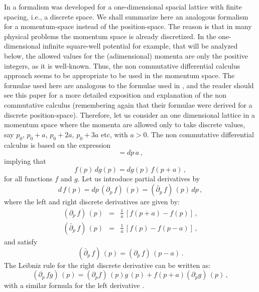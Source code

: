 \documentclass[a4paper,12pt]{article}
\begin{document}
In  \cite{dimakis1} 
a formalism was developed for a one-dimensional 
spacial lattice with finite 
spacing, i.e., a discrete space. We shall summarize here an 
analogous  
formalism for a momentum-space instead of the 
position-space. The 
reason is that in many physical problems the momentum space is 
already discretized. In the 
one-dimensional infinite square-well potential for example, 
that will be analyzed below, 
the allowed values for the (adimensional) momenta are 
only the positive integers, as it is well-known. 
Thus, the non commutative differential calculus 
approach seems to be appropriate to be used in the momentum space.  
The formulae used here are analogous to the formulae used in 
\cite{dimakis1}, and the reader should see this paper for a 
more detailed exposition and explanation of the non commutative 
calculus (remembering again that their formulae 
were derived for a discrete position-space). Therefore, 
let us consider an  
one dimensional lattice in a momentum 
space where the 
momenta are allowed only to take discrete values, say $p_{0}$, 
$p_{0}+a$, $p_{0}+2a$, $p_{0}+3a$ etc, with $a>0$.  
The 
non commutative differential calculus is based on the expression 
\begin{equation}
    [p,dp] = dp \, a
    \label{eq:noncom1} \, ,
\end{equation}
implying that 
\begin{equation}
    f(p) \, dg(p) = dg(p) \, f(p+a) \, ,
    \label{eq:noncom2}
\end{equation}
for all functions $f$ and $g$. Let us introduce partial 
derivatives by 
\begin{equation}
    d \, f(p) = dp \, (\partial_{p} \, f) \, (p) = 
    (\bar{\partial}_{p} \, f) \, (p) \, dp \, ,
    \label{partial}
\end{equation}    
where the left and right discrete  derivatives are given by: 
\begin{eqnarray}
    (\partial_{p} \, f) \, (p) & = & \frac{1}{a} \, [f(p+a) - f(p)] \, ,
    \label{eq:partialleft}  \\
    (\bar{\partial}_{p} \, f) \, (p) & = & \frac{1}{a} \, [f(p) - f(p-a)] \, ,
    \label{eq:partialright}
\end{eqnarray}
and satisfy 
\begin{equation}
  (\bar{\partial}_{p} \, f) \, (p) = (\partial_{p} \, f) \, (p-a)  \, .
    \label{eq:partial2}
\end{equation}
The Leibniz rule for the right discrete derivative can be written as:
\begin{equation}
    (\partial_{p} \, fg) \, (p) = (\partial_{p}f) \, (p) g \, (p) + 
    f(p+a)(\partial_{p} g) \, (p) \, ,
    \label{eq:leibniz}
\end{equation}
with a similar formula for the left derivative \cite{dimakis1}.
\end{document}
